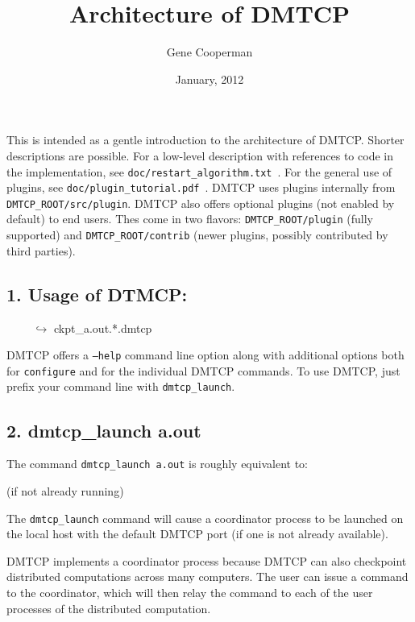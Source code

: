 \documentclass{article}
\title{Architecture of DMTCP}
\author{Gene Cooperman}
\date{January, 2012}
\begin{document}
\maketitle

This is intended as a gentle introduction to the architecture of DMTCP.
Shorter descriptions are possible.  For a low-level description with
references to code in the implementation, see
{\tt doc/restart\_algorithm.txt}~.  For the general use of plugins,
see {\tt doc/plugin\_tutorial.pdf}~.  DMTCP uses plugins internally
from {\tt DMTCP\_ROOT/src/plugin}.  DMTCP also offers optional plugins
(not enabled by default) to end users.  Thes come in two flavors:
{\tt DMTCP\_ROOT/plugin}
(fully supported) and {\tt DMTCP\_ROOT/contrib} (newer plugins,
possibly contributed by third parties).

\subsection*{1. Usage of DTMCP:}
\begin{algorithmic}[1]
 \newline
\hbox{\ \ \ \ } $\hookrightarrow$ ckpt\_a.out.*.dmtcp
\end{algorithmic}

\bigskip
\noindent
DMTCP offers a {\tt --help} command line option along with additional options
both for {\tt configure} and for the individual DMTCP commands.
To use DMTCP, just prefix your command line with {\tt dmtcp\_launch}.

\subsection*{2. dmtcp\_launch a.out}

The command {\tt dmtcp\_launch a.out} is roughly equivalent to:

\begin{algorithmic}[1]
  (if not already running)
\end{algorithmic}

The {\tt dmtcp\_launch} command will cause a coordinator process
to be launched on the local host with the default DMTCP port (if one is
not already available).

DMTCP implements a coordinator process because DMTCP can also checkpoint
distributed computations across many computers.  The user can issue a command
to the coordinator, which will then relay the command to each of
the user processes of the distributed computation.
\end{document}

